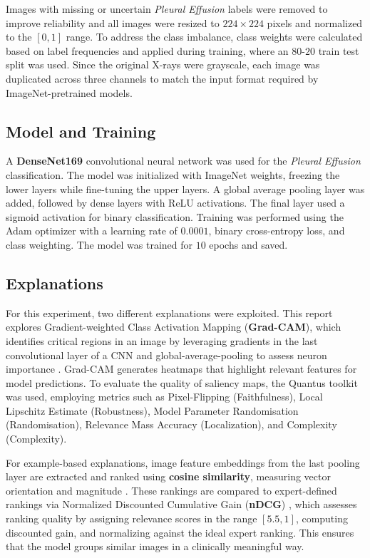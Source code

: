 \documentclass[9pt]{midl} %
\begin{document}
Images with missing or uncertain \emph{Pleural Effusion} labels were removed to improve reliability and all images were resized to \(224 \times 224\) pixels and normalized to the \([0, 1]\) range.
To address the class imbalance, class weights were calculated based on label frequencies and applied during training, where an $80$-$20$ train test split was used.
Since the original X-rays were grayscale, each image was duplicated across three channels to match the input format required by ImageNet-pretrained models.

\subsection*{Model and Training}

A \textbf{DenseNet169} \cite{huang2017densely} convolutional neural network was used for the \emph{Pleural Effusion} classification. The model was initialized with ImageNet \cite{deng2009imagenet} weights, freezing the lower layers while fine-tuning the upper layers. A global average pooling layer was added, followed by dense layers with ReLU activations. The final layer used a sigmoid activation for binary classification. Training was performed using the Adam optimizer with a learning rate of $0.0001$, binary cross-entropy loss, and class weighting. The model was trained for $10$ epochs and saved.

\subsection*{Explanations}

For this experiment, two different explanations were exploited. This report explores Gradient-weighted Class Activation Mapping (\textbf{Grad-CAM}), which identifies critical regions in an image by leveraging gradients in the last convolutional layer of a CNN and global-average-pooling to assess neuron importance \cite{selvaraju2017grad}. Grad-CAM generates heatmaps that highlight relevant features for model predictions. To evaluate the quality of saliency maps, the Quantus toolkit \cite{hedstrom2023quantus} was used, employing metrics such as Pixel-Flipping \cite{bach2015pixel} (Faithfulness), Local Lipschitz Estimate \cite{alvarez2018towards} (Robustness), Model Parameter Randomisation \cite{adebayo2018sanity} (Randomisation), Relevance Mass Accuracy \cite{Arras_2022} (Localization), and Complexity \cite{bhatt2020evaluating} (Complexity).

For example-based explanations, image feature embeddings from the last pooling layer are extracted and ranked using \textbf{cosine similarity}, measuring vector orientation and magnitude \cite{han2022similarity}. These rankings are compared to expert-defined rankings via Normalized Discounted Cumulative Gain (\textbf{nDCG}) \cite{jarvelin2002cumulated}, which assesses ranking quality by assigning relevance scores in the range $[5.5,1]$, computing discounted gain, and normalizing against the ideal expert ranking. This ensures that the model groups similar images in a clinically meaningful way.
\end{document}
